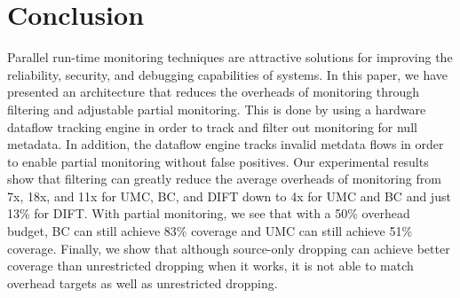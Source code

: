 \section{Conclusion}
\label{sec:conclusion}

Parallel run-time monitoring techniques are attractive solutions for improving
the reliability, security, and debugging capabilities of systems. In this
paper, we have presented an architecture that reduces the overheads of
monitoring through filtering and adjustable partial monitoring. This is done by
using a hardware dataflow tracking engine in order to track and filter out
monitoring for null metadata. In addition, the dataflow engine tracks invalid
metdata flows in order to enable partial monitoring without false positives.
Our experimental results show that filtering can greatly reduce the average
overheads of monitoring from 7x, 18x, and 11x for UMC, BC, and DIFT down to 4x
for UMC and BC and just 13\% for DIFT. With partial monitoring, we see that
with a 50\% overhead budget, BC can still achieve 83\% coverage and UMC can
still achieve 51\% coverage. Finally, we show that although source-only dropping can
achieve better coverage than unrestricted dropping when it works, it is not
able to match overhead targets as well as unrestricted dropping.
